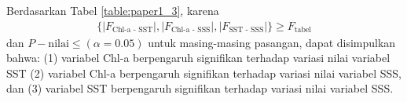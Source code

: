 \begin{spacing}{1.5}
	\begin{table}[H]
		\centering
		\caption{Uji hipotesis}
		\label{table:paper1_2}
	\end{table}
	Berdasarkan Tabel \ref{table:paper1_3}, karena 
	\begin{equation*}
		\begin{aligned}
			\{|F_{\text{Chl-a - SST}}|,|F_{\text{Chl-a - SSS}}|,|F_{\text{SST - SSS}}|\}\geq F_{\text{tabel}} 	
		\end{aligned}	
	\end{equation*} 
	dan $P-\text{nilai}\leq (\alpha=0.05)$ untuk masing-masing pasangan, dapat disimpulkan bahwa: (1) variabel Chl-a berpengaruh signifikan terhadap variasi nilai variabel SST (2) variabel Chl-a berpengaruh signifikan terhadap variasi nilai variabel SSS, dan (3) variabel SST berpengaruh signifikan terhadap variasi nilai variabel SSS.
	

\end{spacing}
